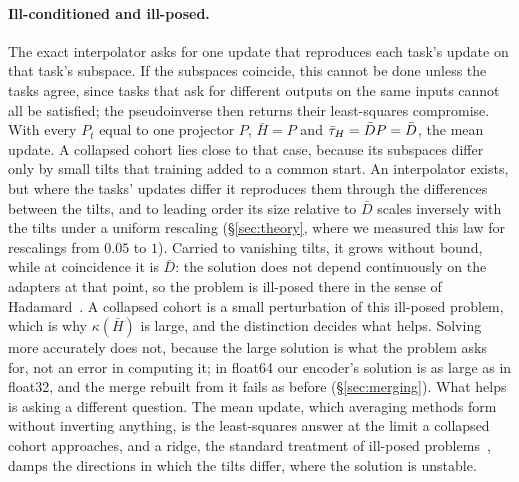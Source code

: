 \paragraph{Ill-conditioned and ill-posed.} The exact interpolator asks for one
update that reproduces each task's update on that task's subspace. If the
subspaces coincide, this cannot be done unless the tasks agree, since tasks
that ask for different outputs on the same inputs cannot all be satisfied; the
pseudoinverse then returns their least-squares compromise. With every $P_t$
equal to one projector $P$, $\bar H = P$ and $\bar{\tau}_H = \bar D P = \bar D$, the
mean update. A collapsed cohort lies close to that case, because its subspaces
differ only by small tilts that training added to a common start. An
interpolator exists, but where the tasks' updates differ it reproduces them
through the differences between the tilts, and to leading order its size
relative to $\bar D$ scales inversely with the tilts under a uniform rescaling
(\S\ref{sec:theory}, where we measured this law for rescalings from $0.05$ to
$1$). Carried to vanishing tilts, it grows without bound, while at coincidence
it is $\bar D$: the solution does not depend continuously on the adapters at
that point, so the problem is ill-posed there in the sense of
Hadamard~\citep{engl1996regularization}.
A collapsed cohort is a small perturbation of this ill-posed problem, which is
why $\kappa(\bar H)$ is large, and the distinction decides what helps. Solving
more accurately does not, because the large solution is what the problem asks
for, not an error in computing it; in float64 our encoder's solution is as
large as in float32, and the merge rebuilt from it fails as before
(\S\ref{sec:merging}). What helps is asking a different question. The
mean update, which averaging methods form without inverting anything, is the
least-squares answer at the limit a collapsed cohort approaches, and a ridge,
the standard treatment of ill-posed problems~\citep{engl1996regularization},
damps the directions in which the tilts differ, where the solution is
unstable.
